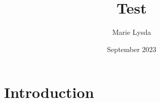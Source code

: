 \documentclass{article}
\title{Test}
\author{Marie Lysda}
\date{September 2023}
\begin{document}
\maketitle
\newpage
\section{Introduction}
\end{document}
